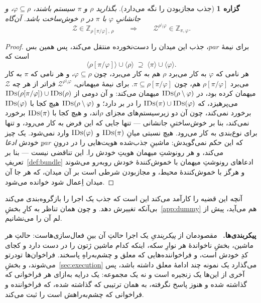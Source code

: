 \documentclass[10pt,oneside,openany]{book}
\newcommand{\pars}{\mathit{par}}
\newcommand{\Zenv}{\mathcal{Z}}
\newcommand{\ZenvSet}{\mathbb{Z}}
\newcommand{\op}[1]{\textnormal{\textsc{#1}}}
\newcommand{\IDs}{\op{IDs}}
\newcommand{\ncl}[1]{\langle #1 \rangle}
\newcommand{\heading}[1]{\medskip\par\noindent\textcolor{accent}{\textbf{#1.}}\ }
\theoremstyle{accentdef}
\theoremstyle{accentplain}
\newtheorem{proposition}[definition]{گزاره}
\begin{document}
\begin{proposition}[جذب مجازبودن را نگه می‌دارد]\label{prop:absorb}
بگذارید $\rho$ و $\pi$ سیستم باشند، $\varphi \subseteq \rho$، و جانشانیِ
$\varphi$ با $\pi$ در $\rho$ خوش‌ساخت باشد. آن‌گاه
\[
  \Zenv \in \ZenvSet_{\rho[\pi/\varphi],\,\rho}
  \qquad\Longrightarrow\qquad
  \Zenv^{\rho \setminus \varphi} \in \ZenvSet_{\pi,\varphi} .
\]
\end{proposition}

\begin{proof}
برای نیمهٔ $\pars$، جذب این میدان را دست‌نخورده منتقل می‌کند، پس همین بس
است که
\[
  \ncl{\rho[\pi/\varphi]} \cup \ncl{\rho} \;\supseteq\; \ncl{\pi} \cup \ncl{\varphi} .
\]
هر نامی که $\varphi$ به کار می‌برد $\rho$ هم به کار می‌برد، چون $\varphi
\subseteq \rho$، و هر نامی که $\pi$ به کار می‌برد $\rho[\pi/\varphi]$ هم،
چون $\pi \subseteq \rho[\pi/\varphi]$. برای نیمهٔ میهمانی، $\Zenv^{\rho
\setminus \varphi}$ فراتر از هر چه $\Zenv$ میهمان کرده بود، در $\IDs(\rho
\setminus \varphi)$ میهمان می‌کند: و آن دومی از $\IDs(\rho[\pi/\varphi])
\cup \IDs(\rho)$ می‌پرهیزد، که $\IDs(\pi) \cup \IDs(\varphi)$ را در بر
دارد؛ و $\IDs(\rho \setminus \varphi)$ هیچ کجا با $\IDs(\varphi)$ برخورد
نمی‌کند، چون آن دو زیرسیستم‌های مجزای $\rho$اند، و هیچ کجا با $\IDs(\pi)$
برخورد نمی‌کند، بنا بر خوش‌ساختیِ جانشانی --- تنها جایی که این فرض به کار
می‌رود، و تنها برای نوع‌بندی به کار می‌رود. هیچ نسبتی میانِ $\IDs(\pi)$ و
$\IDs(\varphi)$ وارد نمی‌شود. یک چیز که این حکم نمی‌گویدش: ماشینِ جذب‌شده
هویت‌هایی را در درونِ $\pars$ِ خودش \emph{ادعا} می‌کند، و هر رونوشتِ
میهمان هویتِ خودش را. این تناقضی نیست --- بنا بر تعریفِ~\ref{def:bundle}
ادعاهای رونوشتِ میهمان با خموش‌کنندهٔ خودش روبه‌رو می‌شوند و هرگز با
خموش‌کنندهٔ محیط، و مجازبودن شرطی است بر آن میدان، که هر جا آن میدان
اِعمال شود خوانده می‌شود.
\end{proof}

آنچه این قضیه را کارآمد می‌کند این است که جذب یک اجرا را بازگروه‌بندی
می‌کند بی‌آنکه تغییرش دهد. و چون همان تناظر به کارِ بخشِ~\ref{app:dummy}
هم می‌آید، پیش از لم آن را می‌نشانیم.

\heading{پیکربندی‌ها} مقصودمان از \emph{پیکربندیِ} یک اجرا حالتِ آن بینِ
فعال‌سازی‌هاست: حالتِ هر ماشین، بخشِ ناخواندهٔ هر نوارِ سکه، اینکه کدام
ماشین ژتون را در دست دارد و کجای کدِ خودش است، و فراخواننده‌هایی که معلق و
چشم‌به‌راهِ پاسخند. فراخوان‌ها تو‌درتو می‌شوند، و
بخشِ~\ref{sec:execution} می‌گذارد یک نمونه چند ادامهٔ معلق داشته باشد، پس
آخری از این‌ها یک زنجیره است و نه یک مجموعه: یک درایه به‌ازای هر
فراخوانی که گذاشته شده و هنوز پاسخ نگرفته، به همان ترتیبی که گذاشته شده،
که فراخواننده و فراخوانی که چشم‌به‌راهش است را ثبت می‌کند.
\end{document}
